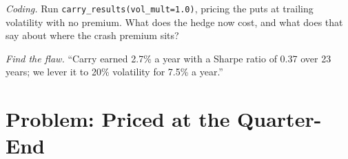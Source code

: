 \begin{exercise}[$\star\star\star$]\label{exo:s2:cross-currency-basis-and-fx-carry:7}
\emph{Coding.} Run \texttt{carry\_results(vol\_mult=1.0)}, pricing the puts at trailing volatility with no premium. What does the hedge now cost, and
what does that say about where the crash premium sits?
\end{exercise}

\begin{exercise}[$\star\star\star$]\label{exo:s2:cross-currency-basis-and-fx-carry:8}
\emph{Find the flaw.} ``Carry earned 2.7\% a year with a Sharpe ratio of 0.37 over 23 years; we lever it to 20\% volatility for 7.5\% a year.''
\end{exercise}

\section{Problem: Priced at the Quarter-End}

